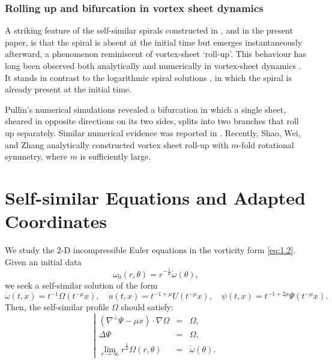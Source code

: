 \documentclass[11pt]{article}
\theoremstyle{definition}
\theoremstyle{remark}
\numberwithin{equation}{section}
\newcommand{\grad}{\nabla}
\begin{document}
\subsubsection{Rolling up and bifurcation in vortex sheet dynamics}

A striking feature of the self-similar spirals constructed in \cite{Ell13, Ell16, SWZ25}, and in the present paper, is that the spiral is absent at the initial time but emerges instantaneously afterward, a phenomenon reminiscent of vortex-sheet `roll-up'. This behaviour has long been observed both analytically and numerically in vortex-sheet dynamics \cite{SS51, Moo74, Moo75}. It stands in contrast to the logarithmic spiral solutions \cite{JS24}, in which the spiral is already present at the initial time.

Pullin’s numerical simulations \cite{Pul78, Pul89} revealed a bifurcation in which a single sheet, sheared in opposite directions on its two sides, splits into two branches that roll up separately. Similar numerical evidence was reported in \cite{LLNZ06}. Recently, Shao, Wei, and Zhang \cite{SWZ26} analytically constructed vortex sheet roll-up with $m$-fold rotational symmetry, where $m$ is sufficiently large.

\section{Self-similar Equations and Adapted Coordinates} \label{sec:2}

We study the 2-D incompressible Euler equations in the vorticity form \eqref{eq:1.2}. Given an initial data
\begin{equation} \label{eq:2.1}
\omega_0(r,\theta) = r^{-\frac{1}{\mu}} \mathring{\omega}(\theta),
\end{equation}
we seek a self-similar solution of the form
\begin{equation} \label{eq:2.2}
\omega(t,x) = t^{-1} \Omega(t^{-\mu} x), \quad u(t,x) = t^{-1+\mu} U(t^{-\mu}x), \quad \psi(t,x) = t^{-1+2\mu} \Psi(t^{-\mu}x).
\end{equation}
Then, the self-similar profile $\Omega$ should satisfy:
\begin{equation} \label{eq:2.3} \left\vert \begin{array}{rcl}
	(\grad^\perp \Psi - \mu x) \cdot \grad \Omega &=& \Omega, \\
	\Delta\Psi &=& \Omega, \\
	\displaystyle\lim_{r\to \infty} r^{\frac{1}{\mu}} \Omega(r,\theta) &=& \mathring{\omega}(\theta).
\end{array} \right. \end{equation}
\end{document}

